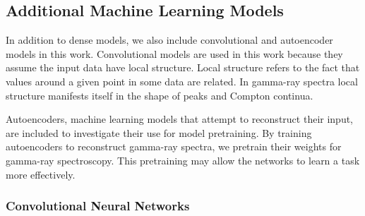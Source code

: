 



\subsection{Additional Machine Learning Models}

In addition to dense models, we also include convolutional and autoencoder models in this work. Convolutional models are used in this work because they assume the input data have local structure. Local structure refers to the fact that values around a given point in some data are related. In gamma-ray spectra local structure manifests itself in the shape of peaks and Compton continua.

Autoencoders, machine learning models that attempt to reconstruct their input, are included to investigate their use for model pretraining. By training autoencoders to reconstruct gamma-ray spectra, we pretrain their weights for gamma-ray spectroscopy. This pretraining may allow the networks to learn a task more effectively.

\subsubsection{Convolutional Neural Networks}

